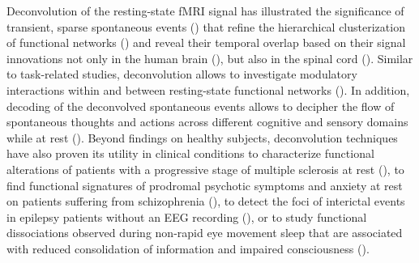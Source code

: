 Deconvolution of the resting-state fMRI signal has illustrated the significance of transient, sparse spontaneous events (\citealt{Petridou2012PeriodsrestfMRI,Allan2015FunctionalConnectivityMRI}) that refine the hierarchical clusterization of functional networks (\citealt{Karahanoglu2013TotalactivationfMRI}) and reveal their temporal overlap based on their signal innovations not only in the human brain (\citealt{Karahanoglu2015Transientbrainactivity}), but also in the spinal cord (\citealt{kinany2020DynamicFunctionalConnectivity}). Similar to task-related studies, deconvolution allows to investigate modulatory interactions within and between resting-state functional networks (\citealt{Di2013ModulatoryInteractionsResting,Di2015Characterizationsrestingstate}). In addition, decoding of the deconvolved spontaneous events allows to decipher the flow of spontaneous thoughts and actions across different cognitive and sensory domains while at rest (\citealt{Karahanoglu2015Transientbrainactivity,GonzalezCastillo2019Imagingspontaneousflow,Tan_2017}). Beyond findings on healthy subjects, deconvolution techniques have also proven its utility in clinical conditions to characterize functional alterations of patients with a progressive stage of multiple sclerosis at rest (\citealt{Bommarito2020Alteredanteriordefault}), to find functional signatures of prodromal psychotic symptoms and anxiety at rest on patients suffering from schizophrenia (\citealt{Zoeller2019Largescalebrain}), to detect the foci of interictal events in epilepsy patients without an EEG recording (\citealt{Lopes2012Detectionepilepticactivity,Karahanoglu2013Spatialmappinginterictal}), or to study functional dissociations observed during non-rapid eye movement sleep that are associated with reduced consolidation of information and impaired consciousness (\citealt{Tarun2020NREMsleepstages}).

